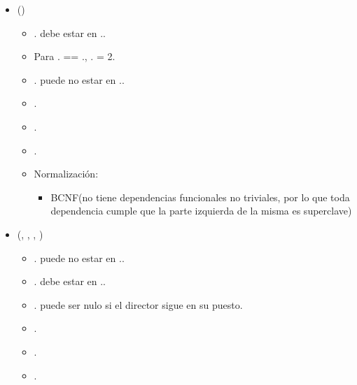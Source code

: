 \begin{itemize}
        \item {}()
            \begin{itemize}
                \item {}. debe estar en
                    ..
                \item Para . == 
                    ., .
                    = 2.
                \item {}. puede no estar en 
                    ..
                \item {}.
                \item {}.
                \item \FK{$\emptyset$}.
                \item Normalización:
                    \begin{itemize}
                        \item BCNF(no tiene dependencias funcionales no 
                            triviales, por lo que toda dependencia cumple que la
                            parte izquierda de la misma es superclave)
                    \end{itemize}
            \end{itemize}

        \item {}(, , ,
                              )
            \begin{itemize}
                \item {}. puede no estar en 
                    ..
                \item {}. debe estar en 
                    ..
                \item {}. puede ser nulo si el director
                    sigue en su puesto.
                \item {}.
                \item {}.
                \item {}.
            \end{itemize}


\end{itemize}
